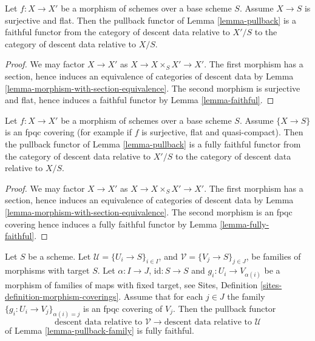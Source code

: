 \begin{lemma}
\label{lemma-morphism-source-faithfully-flat}
Let $f : X \to X'$ be a morphism of schemes over a base scheme $S$.
Assume $X \to S$ is surjective and flat. Then the pullback functor
of Lemma \ref{lemma-pullback} is a faithful functor
from the category of descent data relative to $X'/S$ to the
category of descent data relative to $X/S$.
\end{lemma}

\begin{proof}
We may factor $X \to X'$ as $X \to X \times_S X' \to X'$.
The first morphism has a section, hence induces an equivalence of
categories of descent data by
Lemma \ref{lemma-morphism-with-section-equivalence}.
The second morphism is surjective and flat, hence induces a
faithful functor by Lemma \ref{lemma-faithful}.
\end{proof}

\begin{lemma}
\label{lemma-morphism-source-fpqc-covering}
Let $f : X \to X'$ be a morphism of schemes over a base scheme $S$.
Assume $\{X \to S\}$ is an fpqc covering (for example if $f$ is
surjective, flat and quasi-compact).
Then the pullback functor of Lemma \ref{lemma-pullback} is a
fully faithful functor from the category of descent data relative
to $X'/S$ to the category of descent data relative to $X/S$.
\end{lemma}

\begin{proof}
We may factor $X \to X'$ as $X \to X \times_S X' \to X'$.
The first morphism has a section, hence induces an equivalence of
categories of descent data by
Lemma \ref{lemma-morphism-with-section-equivalence}.
The second morphism is an fpqc covering
hence induces a fully faithful functor by Lemma \ref{lemma-fully-faithful}.
\end{proof}

\begin{lemma}
\label{lemma-fpqc-refinement-coverings-fully-faithful}
Let $S$ be a scheme.
Let $\mathcal{U} = \{U_i \to S\}_{i \in I}$, and
$\mathcal{V} = \{V_j \to S\}_{j \in J}$,
be families of morphisms with target $S$.
Let $\alpha : I \to J$, $\text{id} : S \to S$ and
$g_i : U_i \to V_{\alpha(i)}$ be a morphism of families
of maps with fixed target, see
Sites, Definition \ref{sites-definition-morphism-coverings}.
Assume that for each $j \in J$ the family
$\{g_i : U_i \to V_j\}_{\alpha(i) = j}$ is an fpqc
covering of $V_j$. Then the pullback functor
$$
\text{descent data relative to }
\mathcal{V}
\longrightarrow
\text{descent data relative to }
\mathcal{U}
$$
of Lemma \ref{lemma-pullback-family} is fully faithful.
\end{lemma}

